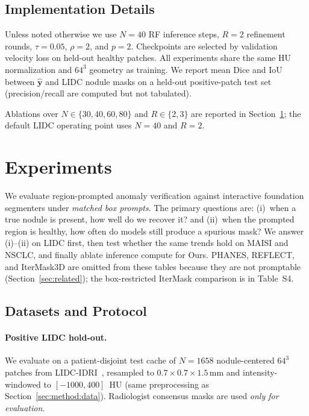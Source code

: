 \documentclass[twoside]{article}
\newcommand{\suppTabUnprompted}{Table~S4}
\begin{document}
\subsection{Implementation Details}
\label{sec:method:impl}

Unless noted otherwise we use \(N{=}40\) RF inference steps, \(R{=}2\)
refinement rounds, \(\tau{=}0.05\), \(\rho{=}2\), and \(p{=}2\).
Checkpoints are selected by validation velocity loss on held-out healthy
patches.
All experiments share the same HU normalization and \(64^{3}\) geometry as
training.
We report mean Dice and IoU between \(\hat{\mathbf{y}}\) and LIDC nodule
masks on a held-out positive-patch test set (precision/recall are computed
but not tabulated).

Ablations over \(N\in\{30,40,60,80\}\) and \(R\in\{2,3\}\) are reported in
Section~\ref{sec:experiments}; the default LIDC operating point uses
\(N{=}40\) and \(R{=}2\).

\section{Experiments}
\label{sec:experiments}

We evaluate region-prompted anomaly verification against
interactive foundation segmenters under \emph{matched box
prompts}. The primary questions are: (i)~when a true nodule is
present, how well do we recover it? and (ii)~when the prompted
region is healthy, how often do models still produce a spurious
mask? We answer (i)--(ii) on LIDC first, then test whether the
same trends hold on MAISI and NSCLC, and finally ablate inference
compute for Ours.
PHANES, REFLECT, and IterMask3D are omitted from these tables because
they are not promptable (Section~\ref{sec:related}); the box-restricted
IterMask comparison is in \suppTabUnprompted{}.

\subsection{Datasets and Protocol}
\paragraph{Positive LIDC hold-out.}
We evaluate on a patient-disjoint test cache of \(N{=}1658\) nodule-centered
\(64^3\) patches from LIDC-IDRI~\citep{lidc2011}, resampled to
\(0.7{\times}0.7{\times}1.5\,\mathrm{mm}\) and intensity-windowed to
\([-1000,400]\)~HU (same preprocessing as Section~\ref{sec:method:data}).
Radiologist consensus masks are used \emph{only for evaluation}.
\end{document}
